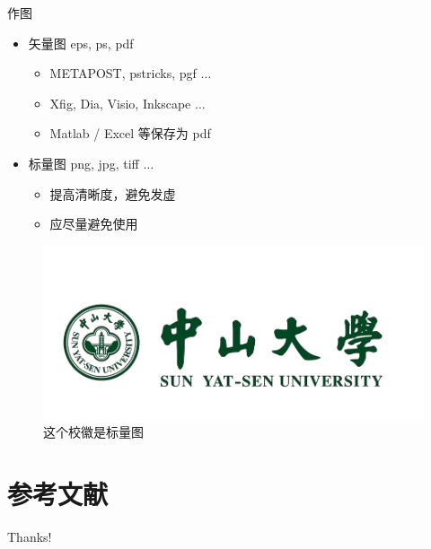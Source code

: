 \documentclass{beamer}
\begin{document}
\begin{frame}{作图}
    \begin{itemize}
        \item 矢量图 eps, ps, pdf
        \begin{itemize}
            \item METAPOST, pstricks, pgf $\ldots$
            \item Xfig, Dia, Visio, Inkscape $\ldots$
            \item Matlab / Excel 等保存为 pdf
        \end{itemize}
        \item 标量图 png, jpg, tiff $\ldots$
        \begin{itemize}
            \item 提高清晰度，避免发虚
            \item 应尽量避免使用
        \end{itemize}
    \end{itemize}
    \begin{figure}[htpb]
        \centering
        \includegraphics[width=0.2\linewidth]{pic/SYSUlogo.png}
        \caption{这个校徽是标量图}
    \end{figure}
\end{frame}

\section{参考文献}

\begin{frame}[allowframebreaks]
    
    
\end{frame}

\begin{frame}
    \begin{center}
        {\Huge\calligra Thanks!}
    \end{center}
\end{frame}
\end{document}
